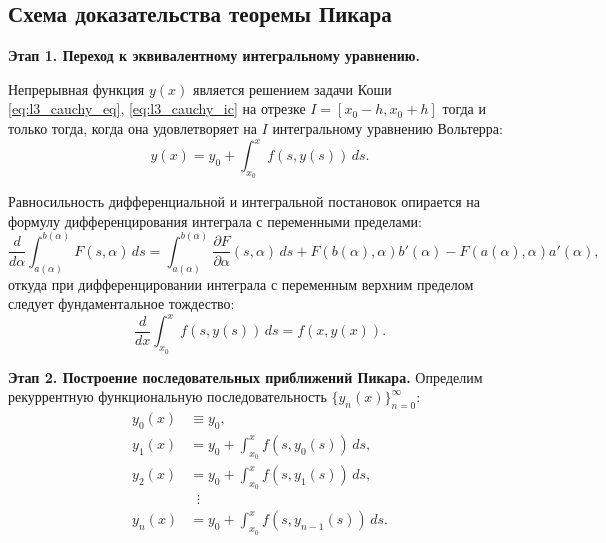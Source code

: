 \subsection{Схема доказательства теоремы Пикара}

\textbf{Этап 1. Переход к эквивалентному интегральному уравнению.}

\begin{lemma}
    Непрерывная функция $y(x)$ является решением задачи Коши
    \eqref{eq:l3_cauchy_eq}, \eqref{eq:l3_cauchy_ic} на отрезке
    $I = [x_0 - h, x_0 + h]$ тогда и только тогда, когда она удовлетворяет на
    $I$ интегральному уравнению Вольтерра:
    \begin{equation} \label{eq:l3_int_eq}
        y(x) = y_0 + \int_{x_0}^{x} f(s, y(s)) \, ds. \tag{5}
    \end{equation}
\end{lemma}

\begin{remark}
    Равносильность дифференциальной и интегральной постановок опирается на
    формулу дифференцирования интеграла с переменными пределами:
    \[
        \frac{d}{d\alpha} \int_{a(\alpha)}^{b(\alpha)} F(s, \alpha) \, ds =
        \int_{a(\alpha)}^{b(\alpha)} \frac{\partial F}{\partial \alpha}(s, \alpha) \, ds
        + F(b(\alpha), \alpha) b'(\alpha) - F(a(\alpha), \alpha) a'(\alpha),
    \]
    откуда при дифференцировании интеграла с переменным верхним пределом
    следует фундаментальное тождество:
    \[
        \frac{d}{dx} \int_{x_0}^{x} f(s, y(s)) \, ds = f(x, y(x)).
    \]
\end{remark}

\textbf{Этап 2. Построение последовательных приближений Пикара.}
Определим рекуррентную функциональную последовательность
$\{y_n(x)\}_{n=0}^\infty$:
\begin{align}
    y_0(x) &\equiv y_0, \nonumber \\
    y_1(x) &= y_0 + \int_{x_0}^{x} f(s, y_0(s)) \, ds, \nonumber \\
    y_2(x) &= y_0 + \int_{x_0}^{x} f(s, y_1(s)) \, ds, \nonumber \\
    &\;\;\vdots \nonumber \\
    y_n(x) &= y_0 + \int_{x_0}^{x} f(s, y_{n-1}(s)) \, ds. \tag{6} \label{eq:l3_picard_seq}
\end{align}

